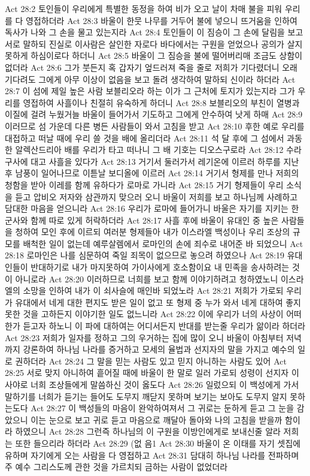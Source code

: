 Act 28:2  토인들이 우리에게 특별한 동정을 하여 비가 오고 날이 차매 불을 피워 우리를 다 영접하더라
Act 28:3  바울이 한뭇 나무를 거두어 불에 넣으니 뜨거움을 인하여 독사가 나와 그 손을 물고 있는지라
Act 28:4  토인들이 이 짐승이 그 손에 달림을 보고 서로 말하되 진실로 이사람은 살인한 자로다 바다에서는 구원을 얻었으나 공의가 살지 못하게 하심이로다 하더니
Act 28:5  바울이 그 짐승을 불에 떨어버리매 조금도 상함이 없더라
Act 28:6  그가 붓든지 혹 갑자기 엎드러져 죽을 줄로 저희가 기다렸더니 오래 기다려도 그에게 아무 이상이 없음을 보고 돌려 생각하여 말하되 신이라 하더라
Act 28:7  이 섬에 제일 높은 사람 보블리오라 하는 이가 그 근처에 토지가 있는지라 그가 우리를 영접하여 사흘이나 친절히 유숙하게 하더니
Act 28:8  보블리오의 부친이 열병과 이질에 걸려 누웠거늘 바울이 들어가서 기도하고 그에게 안수하여 낫게 하매
Act 28:9  이러므로 섬 가운데 다른 병든 사람들이 와서 고침을 받고
Act 28:10  후한 예로 우리를 대접하고 떠날 때에 우리 쓸 것을 배에 올리더라
Act 28:11  석 달 후에 그 섬에서 과동한 알렉산드리아 배를 우리가 타고 떠나니 그 배 기호는 디오스구로라
Act 28:12  수라구사에 대고 사흘을 있다가
Act 28:13  거기서 둘러가서 레기온에 이르러 하루를 지난 후 남풍이 일어나므로 이튿날 보디올에 이르러
Act 28:14  거기서 형제를 만나 저희의 청함을 받아 이레를 함께 유하다가 로마로 가니라
Act 28:15  거기 형제들이 우리 소식을 듣고 압비오 저자와 삼관까지 맞으러 오니 바울이 저희를 보고 하나님께 사례하고 담대한 마음을 얻으니라
Act 28:16  우리가 로마에 들어가니 바울은 자기를 지키는 한 군사와 함께 따로 있게 허락하더라
Act 28:17  사흘 후에 바울이 유대인 중 높은 사람들을 청하여 모인 후에 이르되 여러분 형제들아 내가 이스라엘 백성이나 우리 조상의 규모를 배척한 일이 없는데 예루살렘에서 로마인의 손에 죄수로 내어준 바 되었으니
Act 28:18  로마인은 나를 심문하여 죽일 죄목이 없으므로 놓으려 하였으나
Act 28:19  유대인들이 반대하기로 내가 마지못하여 가이사에게 호소함이요 내 민족을 송사하려는 것이 아니로라
Act 28:20  이러하므로 너희를 보고 함께 이야기하려고 청하였노니 이스라엘의 소망을 인하여 내가 이 쇠사슬에 매인바 되었노라
Act 28:21  저희가 가로되 우리가 유대에서 네게 대한 편지도 받은 일이 없고 또 형제 중 누가 와서 네게 대하여 좋지 못한 것을 고하든지 이야기한 일도 없느니라
Act 28:22  이에 우리가 너의 사상이 어떠한가 듣고자 하노니 이 파에 대하여는 어디서든지 반대를 받는줄 우리가 앎이라 하더라
Act 28:23  저희가 일자를 정하고 그의 우거하는 집에 많이 오니 바울이 아침부터 저녁까지 강론하여 하나님 나라를 증거하고 모세의 율법과 선지자의 말을 가지고 예수의 일로 권하더라
Act 28:24  그 말을 믿는 사람도 있고 믿지 아니하는 사람도 있어
Act 28:25  서로 맞지 아니하여 흩어질 때에 바울이 한 말로 일러 가로되 성령이 선지자 이사야로 너희 조상들에게 말씀하신 것이 옳도다
Act 28:26  일렀으되 이 백성에게 가서 말하기를 너희가 듣기는 들어도 도무지 깨닫지 못하며 보기는 보아도 도무지 알지 못하는도다
Act 28:27  이 백성들의 마음이 완악하여져서 그 귀로는 둔하게 듣고 그 눈을 감았으니 이는 눈으로 보고 귀로 듣고 마음으로 깨달아 돌아와 나의 고침을 받을까 함이라 하였으니
Act 28:28  그런즉 하나님의 이 구원을 이방인에게로 보내신줄 알라 저희는 또한 들으리라 하더라
Act 28:29  (없 음1
Act 28:30  바울이 온 이태를 자기 셋집에 유하며 자기에게 오는 사람을 다 영접하고
Act 28:31  담대히 하나님 나라를 전파하며 주 예수 그리스도께 관한 것을 가르치되 금하는 사람이 없었더라


